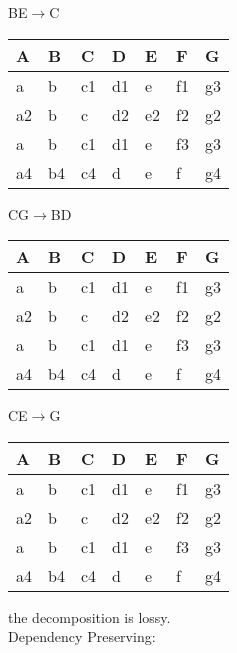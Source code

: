 \documentclass[]{article}
\begin{document}
	BE$\rightarrow$C   \\
	
	\begin{table}[H]
		\begin{tabular}{|l|l|l|l|l|l|l|}
			\hline
			A & B & C  & D  & E  & F  & G  \\ \hline
			a & b & c1 & d1 & e & f1 & g3 \\ \hline
			a2 & b & c & d2 & e2 & f2 & g2 \\ \hline
			a & b & c1 & d1 & e & f3 & g3 \\ \hline
			a4 & b4 & c4 & d & e & f & g4 \\ \hline
		\end{tabular}
	\end{table}

	CG$\rightarrow$BD   \\
	
	\begin{table}[H]
		\begin{tabular}{|l|l|l|l|l|l|l|}
			\hline
			A & B & C  & D  & E  & F  & G  \\ \hline
			a & b & c1 & d1 & e & f1 & g3 \\ \hline
			a2 & b & c & d2 & e2 & f2 & g2 \\ \hline
			a & b & c1 & d1 & e & f3 & g3 \\ \hline
			a4 & b4 & c4 & d & e & f & g4 \\ \hline
		\end{tabular}
	\end{table}

	CE$\rightarrow$G   \\
	
	\begin{table}[H]
		\begin{tabular}{|l|l|l|l|l|l|l|}
			\hline
			A & B & C  & D  & E  & F  & G  \\ \hline
			a & b & c1 & d1 & e & f1 & g3 \\ \hline
			a2 & b & c & d2 & e2 & f2 & g2 \\ \hline
			a & b & c1 & d1 & e & f3 & g3 \\ \hline
			a4 & b4 & c4 & d & e & f & g4 \\ \hline
		\end{tabular}
	\end{table}
	
	\noindent the decomposition is lossy.  \\
	
	\noindent Dependency Preserving:  \\
	
\end{document}
